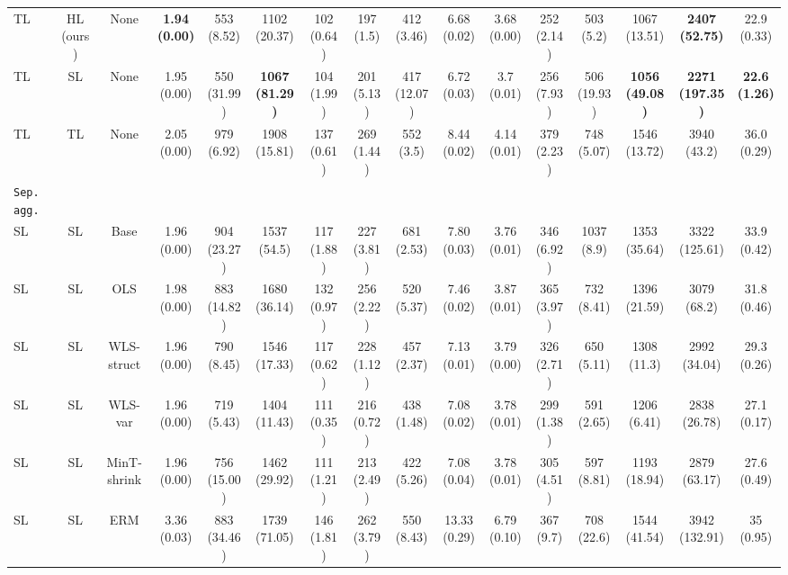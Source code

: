 \documentclass[preprint, 3p, times, twocolumn]{elsarticle}
\begin{document}
\begin{table}
\begin{center}
{\begin{tabular}{l c cccccccccccccc}
  \hspace{0.1cm} 	TL	&HL (ours)	&None	&\textbf{1.94 (0.00)}	&553 (8.52)	&1102 (20.37)	&102 (0.64)	&197 (1.5)	&412 (3.46)	&6.68 (0.02)	&3.68 (0.00)	&252 (2.14)	&503 (5.2)	&1067 (13.51)	&\textbf{2407 (52.75)}	&22.9 (0.33)	\\
  \hspace{0.1cm} 	TL	&SL	&None	&1.95 (0.00)	&550 (31.99)	&\textbf{1067 (81.29)}	&104 (1.99)	&201 (5.13)	&417 (12.07)	&6.72 (0.03)	&3.7 (0.01)	&256 (7.93)	&506 (19.93)	&\textbf{1056 (49.08)}	&\textbf{2271 (197.35)}	&\textbf{22.6 (1.26)}	\\
  \hspace{0.1cm} 	TL	&TL	&None	&2.05 (0.00)	&979 (6.92)	&1908 (15.81)	&137 (0.61)	&269 (1.44)	&552 (3.5)	&8.44 (0.02)	&4.14 (0.01)	&379 (2.23)	&748 (5.07)	&1546 (13.72)	&3940 (43.2)	&36.0 (0.29)	\\
  \midrule																	
  \texttt{Sep. agg.}																	\\
  \hspace{0.1cm} 	SL	&SL	&Base	&1.96 (0.00)	&904 (23.27)	&1537 (54.5)	&117 (1.88)	&227 (3.81)	&681 (2.53)	&7.80 (0.03)	&3.76 (0.01)	&346 (6.92)	&1037 (8.9)	&1353 (35.64)	&3322 (125.61)	&33.9 (0.42)	\\
  \hspace{0.1cm} 	SL	&SL	&OLS	&1.98 (0.00)	&883 (14.82)	&1680 (36.14)	&132 (0.97)	&256 (2.22)	&520 (5.37)	&7.46 (0.02)	&3.87 (0.01)	&365 (3.97)	&732 (8.41)	&1396 (21.59)	&3079 (68.2)	&31.8 (0.46)	\\
  \hspace{0.1cm} 	SL	&SL	&WLS-struct	&1.96 (0.00)	&790 (8.45)	&1546 (17.33)	&117 (0.62)	&228 (1.12)	&457 (2.37)	&7.13 (0.01)	&3.79 (0.00)	&326 (2.71)	&650 (5.11)	&1308 (11.3)	&2992 (34.04)	&29.3 (0.26)	\\
  \hspace{0.1cm} 	SL	&SL	&WLS-var	&1.96 (0.00)	&719 (5.43)	&1404 (11.43)	&111 (0.35)	&216 (0.72)	&438 (1.48)	&7.08 (0.02)	&3.78 (0.01)	&299 (1.38)	&591 (2.65)	&1206 (6.41)	&2838 (26.78)	&27.1 (0.17)	\\
  \hspace{0.1cm} 	SL	&SL	&MinT-shrink	&1.96 (0.00)	&756 (15.00)	&1462 (29.92)	&111 (1.21)	&213 (2.49)	&422 (5.26)	&7.08 (0.04)	&3.78 (0.01)	&305 (4.51)	&597 (8.81)	&1193 (18.94)	&2879 (63.17)	&27.6 (0.49)	\\
  \hspace{0.1cm} 	SL	&SL	&ERM	&3.36 (0.03)	&883 (34.46)	&1739 (71.05)	&146 (1.81)	&262 (3.79)	&550 (8.43)	&13.33 (0.29)	&6.79 (0.10)	&367 (9.7)	&708 (22.6)	&1544 (41.54)	&3942 (132.91)	&35 (0.95)	\\

\end{tabular}}
\end{center}
\end{table}
\end{document}
